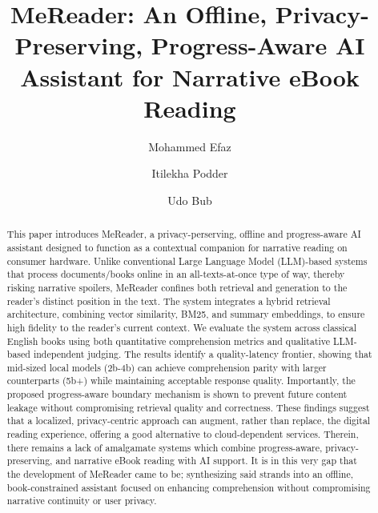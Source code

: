 \documentclass[runningheads]{llncs}
\begin{document}
\title{MeReader: An Offline, Privacy-Preserving, Progress-Aware AI Assistant for Narrative eBook Reading}
\author{Mohammed Efaz \and
Itilekha Podder \and
Udo Bub}
\maketitle

\begin{abstract}
This paper introduces MeReader, a privacy-perserving, offline and progress-aware AI assistant designed to function as a contextual companion for narrative reading on consumer hardware.
Unlike conventional Large Language Model (LLM)-based systems that process documents/books online in an all-texts-at-once type of way, thereby risking narrative spoilers, MeReader confines both retrieval and generation to the reader's distinct position in the text.
The system integrates a hybrid retrieval architecture, combining vector similarity, BM25, and summary embeddings, to ensure high fidelity to the reader's current context.
We evaluate the system across classical English books using both quantitative comprehension metrics and qualitative LLM-based independent judging.
The results identify a quality-latency frontier, showing that mid-sized local models (2b-4b) can achieve comprehension parity with larger counterparts (5b+) while maintaining acceptable response quality.
Importantly, the proposed progress-aware boundary mechanism is shown to prevent future content leakage without compromising retrieval quality and correctness.
These findings suggest that a localized, privacy-centric approach can augment, rather than replace, the digital reading experience, offering a good alternative to cloud-dependent services. 
Therein, there remains a lack of amalgamate systems which combine progress-aware, privacy-preserving, and narrative eBook reading with AI support.
It is in this very gap that the development of MeReader came to be; synthesizing said strands into an offline, book-constrained assistant focused on enhancing comprehension
without compromising narrative continuity or user privacy.
\end{abstract}
\end{document}
